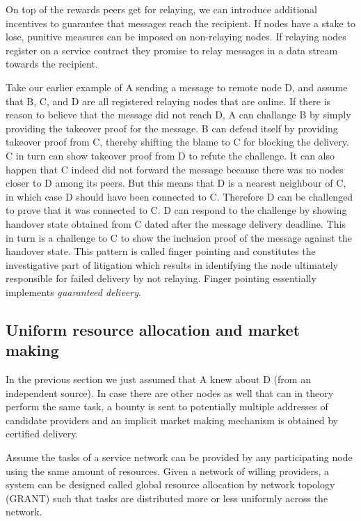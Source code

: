 \documentclass[a4paper,10pt]{article}
\begin{document}
On top of the rewards peers get for relaying, we can introduce additional
incentives to guarantee that messages reach the recipient.
If nodes have a stake to lose, punitive measures can be imposed on non-relaying nodes.
If relaying nodes register on a service contract they promise to relay messages in a data stream
towards the recipient.

Take our earlier example of A sending a message to remote node D, and assume that
B, C, and D are all registered relaying nodes that are online. If there is reason
to believe that the message did not reach D, A can challange B by simply providing
the takeover proof for the message. B can defend itself by providing takeover proof from C,
thereby shifting the blame to C for blocking the delivery. C in turn can show takeover proof
from D to refute the challenge. It can also happen that C indeed did not forward the message
because there was no nodes closer to D among its peers. But this means that
D is a nearest neighbour of C, in which case D should have been connected to C.
Therefore D can be challenged to prove that it was connected to C. D can respond to the challenge
by showing handover state obtained from C dated after the message delivery deadline. This in turn is
a challenge to C to show the inclusion proof of the message against the handover state.
This pattern is called \gls{finger pointing} and constitutes the investigative part
of litigation which results in identifying the node
ultimately responsible for failed delivery by not relaying.
Finger pointing essentially implements \emph{guaranteed delivery}.

\subsection{Uniform resource allocation and market making}

In the previous section we just assumed that A knew about D (from an independent source).
In case there are other nodes as well that can in theory perform the same task,
a bounty is sent to potentially multiple addresses of candidate providers
and an implicit market making mechanism is obtained by certified delivery.

Assume the tasks of a service network can be provided by any participating node using
the same amount of resources. Given a network of willing providers, a system can be designed
called \gls{global resource allocation by network topology (GRANT)}
such that tasks are distributed more or less uniformly across the network.
\end{document}
